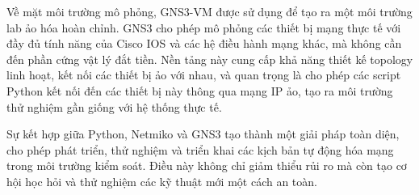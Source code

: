     Về mặt môi trường mô phỏng, GNS3-VM được sử dụng để tạo ra một môi trường lab ảo hóa hoàn chỉnh\cite{GNS3-Homepage}. GNS3 cho phép mô phỏng các thiết bị mạng thực tế với đầy đủ tính năng của Cisco IOS và các hệ điều hành mạng khác, mà không cần đến phần cứng vật lý đắt tiền. Nền tảng này cung cấp khả năng thiết kế topology linh hoạt, kết nối các thiết bị ảo với nhau, và quan trọng là cho phép các script Python kết nối đến các thiết bị này thông qua mạng IP ảo, tạo ra môi trường thử nghiệm gần giống với hệ thống thực tế.

    Sự kết hợp giữa Python, Netmiko và GNS3 tạo thành một giải pháp toàn diện, cho phép phát triển, thử nghiệm và triển khai các kịch bản tự động hóa mạng trong môi trường kiểm soát. Điều này không chỉ giảm thiểu rủi ro mà còn tạo cơ hội học hỏi và thử nghiệm các kỹ thuật mới một cách an toàn.

